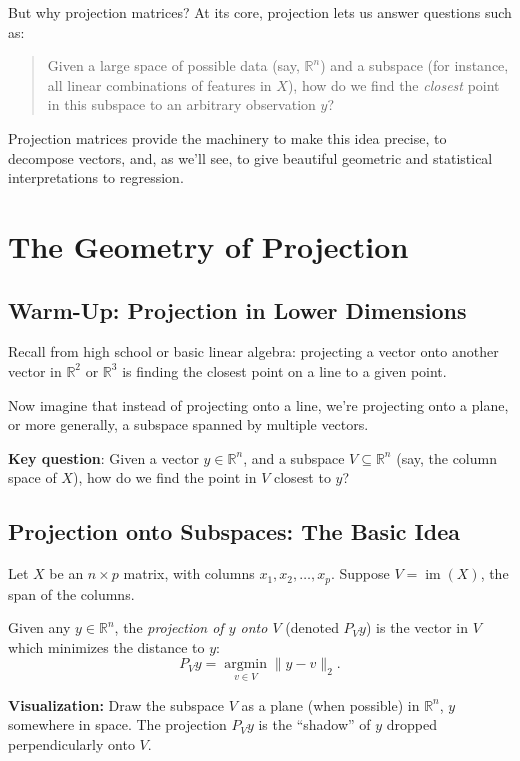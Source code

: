 \documentclass[11pt,a4paper]{article}
\theoremstyle{definition}
\theoremstyle{plain}
\theoremstyle{remark}
\begin{document}
But why projection matrices? At its core, projection lets us answer questions such as:
\begin{quote}
    Given a large space of possible data (say, $\mathbb{R}^n$) and a subspace (for instance, all linear combinations of features in $X$), how do we find the \emph{closest} point in this subspace to an arbitrary observation $y$?
\end{quote}

Projection matrices provide the machinery to make this idea precise, to decompose vectors, and, as we'll see, to give beautiful geometric and statistical interpretations to regression.

\section{The Geometry of Projection}

\subsection{Warm-Up: Projection in Lower Dimensions}

Recall from high school or basic linear algebra: projecting a vector onto another vector in $\mathbb{R}^2$ or $\mathbb{R}^3$ is finding the closest point on a line to a given point.

Now imagine that instead of projecting onto a line, we're projecting onto a plane, or more generally, a subspace spanned by multiple vectors.

\medskip

\textbf{Key question}: Given a vector $y \in \mathbb{R}^n$, and a subspace $V \subseteq \mathbb{R}^n$ (say, the column space of $X$), how do we find the point in $V$ closest to $y$?

\subsection{Projection onto Subspaces: The Basic Idea}

Let $X$ be an $n \times p$ matrix, with columns $x_1, x_2, \ldots, x_p$. Suppose $V = \operatorname{im}(X)$, the span of the columns.

Given any $y \in \mathbb{R}^n$, the \emph{projection of $y$ onto $V$} (denoted $P_V y$) is the vector in $V$ which minimizes the distance to $y$:
\[
P_V y = \operatorname*{argmin}_{v \in V} \| y - v \|_2.
\]

\textbf{Visualization:} Draw the subspace $V$ as a plane (when possible) in $\mathbb{R}^n$, $y$ somewhere in space. The projection $P_V y$ is the ``shadow'' of $y$ dropped perpendicularly onto $V$.
\end{document}
